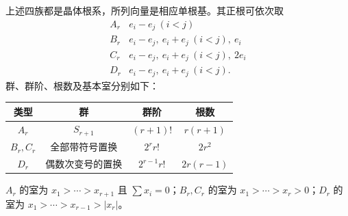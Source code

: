 \begin{proposition}\label{g1:prop:classical-root-data}
	上述四族都是晶体根系，所列向量是相应单根基。其正根可依次取
	\[
		\begin{array}{c|l}
		A_r&e_i-e_j\ (i<j)\\
		B_r&e_i-e_j,\ e_i+e_j\ (i<j),\ e_i\\
		C_r&e_i-e_j,\ e_i+e_j\ (i<j),\ 2e_i\\
		D_r&e_i-e_j,\ e_i+e_j\ (i<j).
		\end{array}
	\]
	群、群阶、根数及基本室分别如下：
	\begin{center}
	\begin{tabular}{cccc}
		\toprule
		类型&群&群阶&根数\\
		\midrule
		\(A_r\)&\(S_{r+1}\)&\((r+1)!\)&\(r(r+1)\)\\
		\(B_r,C_r\)&全部带符号置换&\(2^r r!\)&\(2r^2\)\\
		\(D_r\)&偶数次变号的置换&\(2^{r-1}r!\)&\(2r(r-1)\)\\
		\bottomrule
	\end{tabular}
	\end{center}
	\(A_r\) 的室为 \(x_1>\cdots>x_{r+1}\) 且 \(\sum x_i=0\)；\(B_r,C_r\) 的室为 \(x_1>\cdots>x_r>0\)；\(D_r\) 的室为 \(x_1>\cdots>x_{r-1}>|x_r|\)。
\end{proposition}
